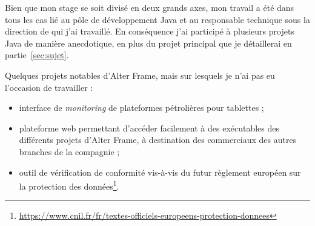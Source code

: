Bien que mon stage se soit divisé en deux grands axes, mon travail a été dans tous les cas lié au pôle de développement Java et au responsable technique sous la direction de qui j'ai travaillé. En conséquence j'ai participé à plusieurs projets Java de manière anecdotique, en plus du projet principal que je détaillerai en partie~\ref{sec:sujet}.

Quelques projets notables d'Alter Frame, mais sur lesquels je n'ai pas eu l'occasion de travailler :
\begin{itemize}[label=$\bullet$]
	\item interface de \textit{monitoring} de plateformes pétrolières pour tablettes ;
	\item plateforme web permettant d'accéder facilement à des exécutables des différents projets d'Alter Frame, à destination des commerciaux des autres branches de la compagnie ;
	\item outil de vérification de conformité vis-à-vis du futur règlement européen sur la protection des données\footnote{\url{https://www.cnil.fr/fr/textes-officiels-europeens-protection-donnees}}.
\end{itemize}